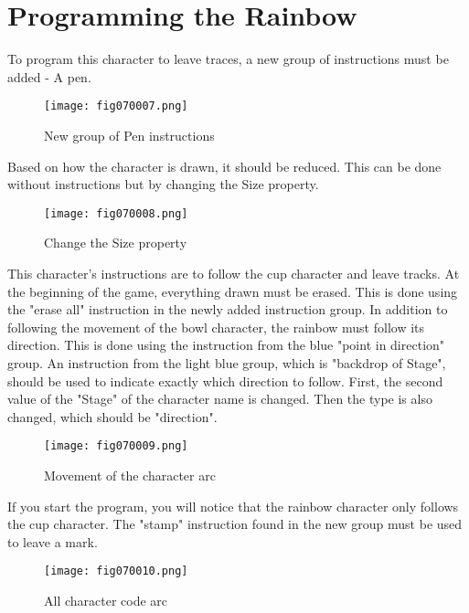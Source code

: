 \section{Programming the Rainbow}
To program this character to leave traces, a new group of instructions must be added - A pen.

\begin{figure}[H]
   \centering
   \texttt{[image: fig070007.png]}
   \caption{New group of Pen instructions}
\label{fig070007}
\end{figure}

Based on how the character is drawn, it should be reduced. This can be done without instructions but by changing the Size property.

\begin{figure}[H]
   \centering
   \texttt{[image: fig070008.png]}
   \caption{Change the Size property}
\label{fig070008}
\end{figure}

This character's instructions are to follow the cup character and leave tracks. At the beginning of the game, everything drawn must be erased. This is done using the "erase all" instruction in the newly added instruction group. In addition to following the movement of the bowl character, the rainbow must follow its direction. This is done using the instruction from the blue "point in direction" group. An instruction from the light blue group, which is "backdrop of Stage", should be used to indicate exactly which direction to follow. First, the second value of the "Stage" of the character name is changed. Then the type is also changed, which should be "direction".

\begin{figure}[H]
   \centering
   \texttt{[image: fig070009.png]}
   \caption{Movement of the character arc}
\label{fig070009}
\end{figure}

If you start the program, you will notice that the rainbow character only follows the cup character. The "stamp" instruction found in the new group must be used to leave a mark.

\begin{figure}[H]
   \centering
   \texttt{[image: fig070010.png]}
   \caption{All character code arc}
\label{fig070010}
\end{figure}

